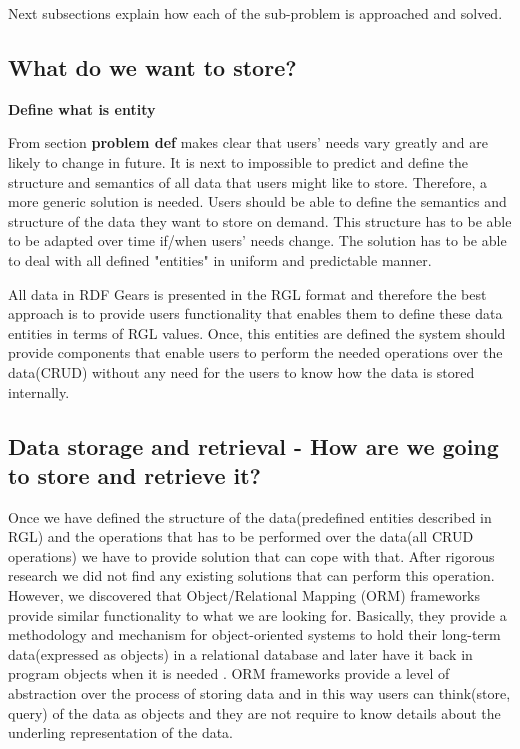 \documentclass[a4paper, notitlepage]{article}
\begin{document}
Next subsections explain how each of the sub-problem is approached and solved.

\subsection{What do we want to store?}

\textbf{Define what is entity}

From section \textbf{problem def} makes clear that users' needs vary greatly and are likely to change in future. It is next to impossible to predict and define the structure and semantics of all data that users might like to store. Therefore, a more generic solution is needed. Users should be able to define the semantics and structure of the data they want to store on demand. This structure has to be able to be adapted over time if/when users' needs change. The solution has to be able to deal with all defined "entities" in uniform and predictable manner.   

All data in RDF Gears is presented in the RGL format and therefore the best approach is to provide users functionality that enables them to define these data entities in terms of RGL values. Once, this entities are defined the system should provide components that enable users to perform the needed operations over the data(CRUD) without any need for the users to know how the data is stored internally.

\subsection{Data storage and retrieval - How are we going to store and retrieve it? }

Once we have defined the structure of the data(predefined entities described in RGL) and the operations that has to be performed over the data(all CRUD operations) we have to provide solution that can cope with that. After rigorous research we did not find any existing solutions that can perform this operation. However, we discovered that Object/Relational Mapping (ORM) frameworks provide similar functionality to what we are looking for. Basically, they provide a methodology and mechanism for object-oriented systems to hold their long-term data(expressed as objects) in a relational database and later have it back in program objects when it is needed \cite{Neil}. ORM frameworks provide a level of abstraction over the process of storing data and in this way users can think(store, query) of the data as objects and they are not require to know details about the underling representation of the data. 
\end{document}
